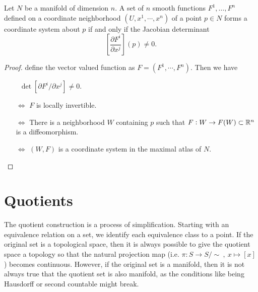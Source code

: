 \begin{corollary}
	Let $ N $ be a manifold of dimension $ n $. A set of $ n $ smooth functions $ F^1,\dots,F^n $ defined on a coordinate neighborhood $ (U,x^1,\cdots,x^n) $ of a point $ p \in N $ forms a coordinate system about $ p $ if and only if the Jacobian determinant 
	\[ \left[  \frac{\partial F^i}{\partial x^j}  \right](p) \neq 0. \]
\end{corollary}



\begin{proof}
	define the vector valued function as $ F = (F^1,\cdots,F^n) $. Then we have
	\begin{itemize}
		\item[$\,$] $ \det[\partial F^i/\partial x^j] \neq 0 $.
		\item[$\Longleftrightarrow$] $ F $ is locally invertible.
		\item[$\Longleftrightarrow$] There is a neighborhood $ W $ containing $ p $ such that $ F:W \to F(W) \subset \mathbb{R}^n $ is a diffeomorphism.
		\item[$\Longleftrightarrow$] $ (W,F) $ is a coordinate system in the maximal atlas of $ N $.
	\end{itemize}
\end{proof}




\section{Quotients}
The quotient construction is a process of simplification. Starting with an equivalence relation on a set, we identify each equivalence class to a point. If the original set is a topological space, then it is always possible to give the quotient space a topology so that the natural projection map (i.e. $ \pi: S\to S/\sim\ ,\ x\mapsto [x] $) becomes continuous. However, if the original set is a manifold, then it is not always true that the quotient set is also manifold, as the conditions like being Hausdorff or second countable might break.

